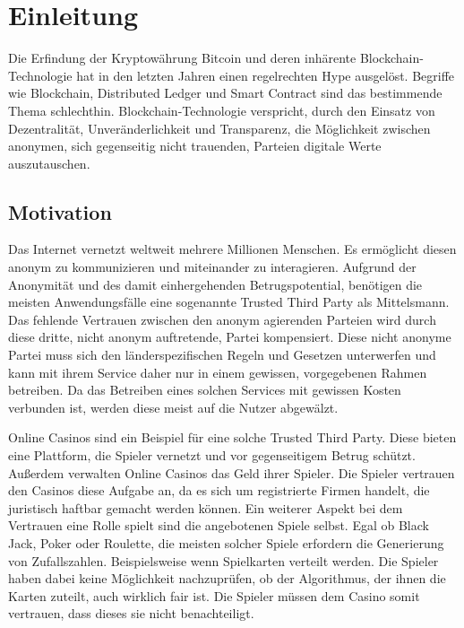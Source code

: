 \chapter{Einleitung} %
\label{Chapter1}
\newcommand{\keyword}[1]{\textbf{#1}}
\newcommand{\tabhead}[1]{\textbf{#1}}
\newcommand{\code}[1]{\texttt{#1}}
\newcommand{\file}[1]{\texttt{\bfseries#1}}
\newcommand{\option}[1]{\texttt{\itshape#1}}
Die Erfindung der Kryptowährung Bitcoin und deren inhärente Blockchain-Technologie hat in den letzten Jahren einen regelrechten Hype ausgelöst. Begriffe wie Blockchain, Distributed Ledger und Smart Contract sind das bestimmende Thema schlechthin. 
Blockchain-Technologie verspricht, durch den Einsatz von Dezentralität, Unveränderlichkeit und Transparenz, die Möglichkeit zwischen anonymen, sich gegenseitig nicht trauenden, Parteien digitale Werte auszutauschen.

\section{Motivation}
Das Internet vernetzt weltweit mehrere Millionen Menschen. Es ermöglicht diesen anonym zu kommunizieren und miteinander zu interagieren. Aufgrund der Anonymität und des damit einhergehenden Betrugspotential, benötigen die meisten Anwendungsfälle eine sogenannte Trusted Third Party als Mittelsmann. Das fehlende Vertrauen zwischen den anonym agierenden Parteien wird durch diese dritte, nicht anonym auftretende, Partei kompensiert. Diese nicht anonyme Partei muss sich den länderspezifischen Regeln und Gesetzen unterwerfen und kann mit ihrem Service daher nur in einem gewissen, vorgegebenen Rahmen betreiben. Da das Betreiben eines solchen Services mit gewissen Kosten verbunden ist, werden diese meist auf die Nutzer abgewälzt. 

Online Casinos sind ein Beispiel für eine solche Trusted Third Party. Diese bieten eine Plattform, die Spieler vernetzt und vor gegenseitigem Betrug schützt. Außerdem verwalten Online Casinos das Geld ihrer Spieler. Die Spieler vertrauen den Casinos diese Aufgabe an, da es sich um registrierte Firmen handelt, die juristisch haftbar gemacht werden können. Ein weiterer Aspekt bei dem Vertrauen eine Rolle spielt sind die angebotenen Spiele selbst. Egal ob Black Jack, Poker oder Roulette, die meisten solcher Spiele erfordern die Generierung von Zufallszahlen. Beispielsweise wenn Spielkarten verteilt werden. Die Spieler haben dabei keine Möglichkeit nachzuprüfen, ob der Algorithmus, der ihnen die Karten zuteilt, auch wirklich fair ist. Die Spieler müssen dem Casino somit vertrauen, dass dieses sie nicht benachteiligt. 

